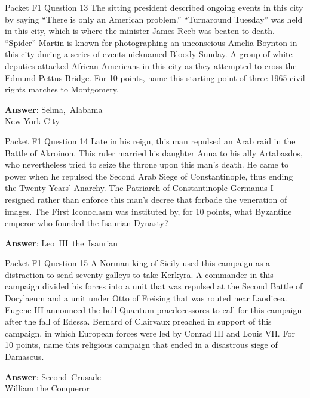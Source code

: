 \begin{frame}{Packet F1 Question 13}
The sitting president described ongoing events in this city by saying “There is only an American problem.” “Turnaround Tuesday” was held in this city, which is where the minister James Reeb was beaten to death. “Spider” Martin is known for photographing an unconscious Amelia Boynton in this city during   a series of events   nicknamed Bloody Sunday. A group of white   deputies attacked African-Americans in this city as they attempted to cross the Edmund Pettus Bridge. For 10 points, name this starting point of three 1965 civil rights marches to Montgomery.  

\textbf{Answer}: Selma,\ Alabama\\
 New York City
\end{frame}

\begin{frame}{Packet F1 Question 14}
Late in his reign, this man repulsed an Arab raid in the Battle of Akroinon. This ruler married his daughter Anna to his ally Artabasdos, who   nevertheless tried to seize the throne upon this man’s death. He came to power when he repulsed the Second Arab Siege of Constantinople, thus ending the Twenty Years’ Anarchy. The Patriarch of Constantinople   Germanus I resigned   rather than   enforce this man’s decree that forbade the veneration of images. The First Iconoclasm was instituted by, for 10 points, what Byzantine emperor who founded the Isaurian Dynasty?

\textbf{Answer}: Leo\ III\ the\ Isaurian\\
\end{frame}

\begin{frame}{Packet F1 Question 15}
A Norman king of Sicily   used this campaign as a distraction to send seventy galleys to take Kerkyra. A commander in this campaign divided his forces into a unit that was repulsed at the Second Battle of Dorylaeum and a unit under Otto of Freising that was routed near Laodicea. Eugene   III announced the   bull Quantum praedecessores to call for this campaign after the fall of Edessa. Bernard of Clairvaux   preached in support of this campaign,   in which European forces were led by Conrad III and Louis VII. For 10 points, name this religious campaign that ended in a disastrous siege of Damascus.

\textbf{Answer}: Second\ Crusade\\
 William the Conqueror
\end{frame}

